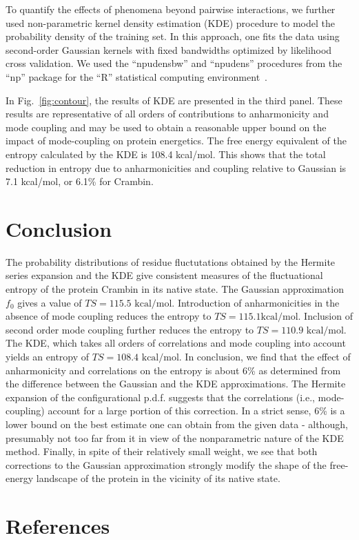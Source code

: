 \documentclass[12pt,article]{iopart}
\begin{document}
To quantify the effects of phenomena beyond pairwise interactions, we
further used non-parametric kernel density estimation (KDE) procedure
to model the probability density of the training set.  In this
approach, one fits the data using second-order Gaussian kernels with
fixed bandwidths optimized by likelihood cross validation.  We used
the ``npudensbw'' and ``npudens'' procedures from the ``np'' package
for the ``R'' statistical computing environment~\cite{hayfield2008nonparametric}.

In Fig.~\ref{fig:contour}, the results of KDE are presented in the
third panel.  These results are representative of all orders of
contributions to anharmonicity and mode coupling and may be used to
obtain a reasonable upper bound on the impact of mode-coupling on
protein energetics.  The free energy equivalent of the entropy
calculated by the KDE is 108.4 kcal/mol.  This shows that the total
reduction in entropy due to anharmonicities and coupling relative to
Gaussian is 7.1 kcal/mol, or 6.1\% for Crambin.

\section{Conclusion}

The probability distributions of residue fluctutations
obtained by the Hermite series expansion and the KDE give consistent
measures of the fluctuational entropy of the protein Crambin in its
native state. The Gaussian approximation $f_0$ gives a value of $TS =
115.5 \mbox{ kcal/mol}$.  Introduction of anharmonicities in the
absence of mode coupling reduces the entropy to $TS = 115.1 \mbox{
  kcal/mol}$.  Inclusion of second order mode coupling further reduces
the entropy to $TS=110.9 \mbox{ kcal/mol}$.  The KDE, which takes all
orders of correlations and mode coupling into account yields an
entropy of $TS = 108.4 \mbox{ kcal/mol}$.
In conclusion, we find that the effect of anharmonicity and
correlations on the entropy is about 6\% as determined from the
difference between the Gaussian and the KDE approximations. The
Hermite expansion of the configurational p.d.f. suggests that the
correlations (i.e., mode-coupling) account for a large portion of this
correction. In a strict sense, 6\% is a lower bound on the best
estimate one can obtain from the given data - although, presumably not
too far from it in view of the nonparametric nature of the KDE
method. Finally, in spite of their relatively small weight, we see
that both corrections to the Gaussian approximation strongly modify
the shape of the free-energy landscape of the protein in the vicinity
of its native state.

\section*{References}


\end{document}
